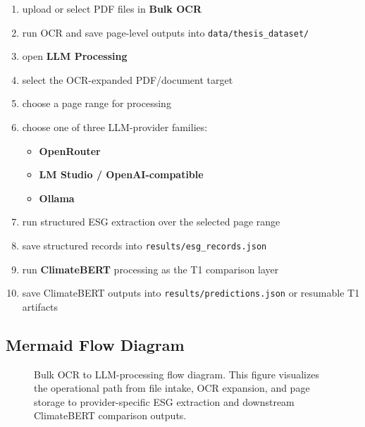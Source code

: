 \begin{enumerate}
\def\labelenumi{\arabic{enumi}.}
\tightlist
\item
  upload or select PDF files in \textbf{Bulk OCR}
\item
  run OCR and save page-level outputs into \texttt{data/thesis\_dataset/}
\item
  open \textbf{LLM Processing}
\item
  select the OCR-expanded PDF/document target
\item
  choose a page range for processing
\item
  choose one of three LLM-provider families:

  \begin{itemize}
  \tightlist
  \item
    \textbf{OpenRouter}
  \item
    \textbf{LM Studio / OpenAI-compatible}
  \item
    \textbf{Ollama}
  \end{itemize}
\item
  run structured ESG extraction over the selected page range
\item
  save structured records into \texttt{results/esg\_records.json}
\item
  run \textbf{ClimateBERT} processing as the T1 comparison layer
\item
  save ClimateBERT outputs into \texttt{results/predictions.json} or resumable T1 artifacts
\end{enumerate}

\subsection{Mermaid Flow Diagram}\label{mermaid-flow-diagram}

\begin{figure}[ht]
\begin{center}
\end{center}
\caption{Bulk OCR to LLM-processing flow diagram. This figure visualizes the operational path from file intake, OCR expansion, and page storage to provider-specific ESG extraction and downstream ClimateBERT comparison outputs.}
\label{fig:appendix_bulkocr_llm_climatebert_flow}
\end{figure}

